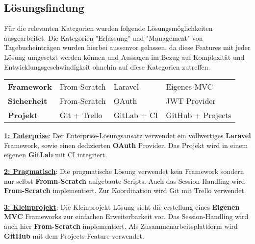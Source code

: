 \subsection{Lösungsfindung}
Für die relevanten Kategorien wurden folgende Lösungsmöglichkeiten ausgearbeitet. Die Kategorien "Erfassung" und "Management" von Tagebucheinträgen wurden hierbei aussenvor gelassen, da diese Features mit jeder Lösung umgesetzt werden können und Aussagen im Bezug auf Komplexität und Entwicklungsgeschwindigkeit ohnehin auf diese Kategorien zutreffen.

\vspace{5mm}

\begin{tabular}{llll}
    \textbf{Framework} & From-Scratch & Laravel & Eigenes-MVC \\
    \textbf{Sicherheit} & From-Scratch & OAuth & JWT Provider \\
    \textbf{Projekt} & Git + Trello & GitLab + CI & GitHub + Projects \\
\end{tabular} 

\vspace{5mm}

\noindent
\underline{\textbf{1: Enterprise}}: 
Der Enterprise-Lösungsansatz verwendet ein vollwertiges \textbf{Laravel} Framework, sowie einen dedizierten \textbf{OAuth} Provider. Das Projekt wird in einem eigenen \textbf{GitLab} mit CI integriert.

\vspace{2mm}
\noindent
\underline{\textbf{2: Pragmatisch}}: 
Die pragmatische Lösung verwendet kein Framework sondern nur selbst \textbf{Fromn-Scratch} aufgebaute Scripts. Auch das Session-Handling wird \textbf{From-Scratch} implementiert. Zur Koordination wird Git mit Trello verwendet.

\vspace{2mm}
\noindent
\underline{\textbf{3: Kleinprojekt}}: 
Die Kleinprojekt-Lösung sieht die erstellung eines \textbf{Eigenen MVC} Frameworks zur einfachen Erweiterbarkeit vor. Das Session-Handling wird auch hier \textbf{From-Scratch} implementiert. Als Zusammenarbeitsplattform wird \textbf{GitHub} mit dem Projects-Feature verwendet.


